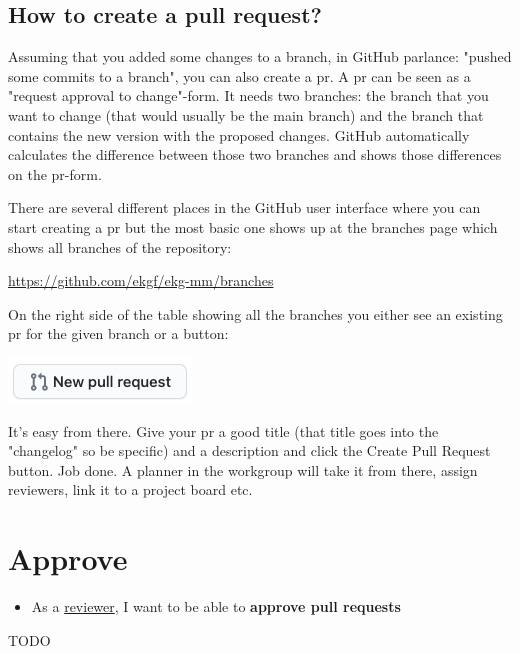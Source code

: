 \subsection{How to create a pull request?}
\label{subsec:ekg-mm-process-how-to-create-a-pull-request}

Assuming that you added some changes to a branch, in GitHub parlance: 
"pushed some commits to a branch", you can also create a \gls{pr}. 
A \gls{pr} can be seen as a "request approval to change"-form. 
It needs two branches: the branch that you want to change (that would 
usually be the main branch) and the branch that contains the new version 
with the proposed changes. 
GitHub automatically calculates the difference between those two branches
and shows those differences on the \gls{pr}-form.

There are several different places in the GitHub user interface where you 
can start creating a \gls{pr} but the most basic one shows up at the branches 
page which shows all branches of the repository:

\begin{center}
    \url{https://github.com/ekgf/ekg-mm/branches}
\end{center}

On the right side of the table showing all the branches you either see an 
existing \gls{pr} for the given branch or a button:

\begin{center}
    \includegraphics[scale=0.5]{../images/ekgmm-process-pr-button.png}
\end{center}

It’s easy from there. 
Give your \gls{pr} a good title (that title goes into the "changelog" so be 
specific) and a description and click the Create Pull Request button. 
Job done. A planner in the workgroup will take it from there, 
assign reviewers, link it to a project board etc.

\section{Approve}
\label{sec:ekg-mm-process-approve}

\begin{tcolorbox}[colback=secondary!5,colframe=secondary!80,title=\textbf{User Stories}]
    \begin{itemize}[leftmargin=1em]
        \item As a \underline{reviewer}, I want to be able to \textbf{approve pull requests}
    \end{itemize}
\end{tcolorbox}

TODO

